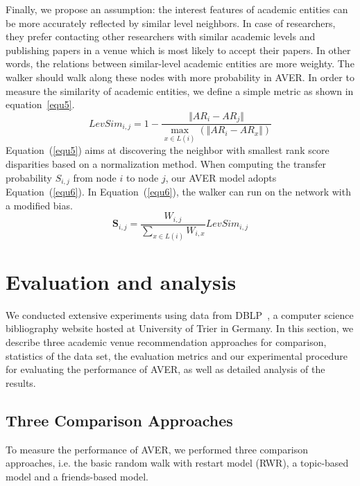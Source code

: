 \documentclass[9pt]{acm_proc_article-sp}
\begin{document}
Finally, we propose an assumption: the interest features of academic entities can be more accurately reflected by similar level neighbors. In case of researchers, they prefer contacting other researchers with similar academic levels and publishing papers in a venue which is most likely to accept their papers. In other words, the relations between similar-level academic entities are more weighty. The walker should walk along these nodes with more probability in AVER. In order to measure the similarity of academic entities, we define a simple metric as shown in equation~\ref{equ5}.
\begin{equation}
\label{equ5}
LevSim_{i,j}=1-\frac{\Vert AR_{i}-AR_{j}\Vert}{\max_{x\in L(i)}(\Vert AR_{i}-AR_{x}\Vert)}
\end{equation}
 Equation~(\ref{equ5}) aims at discovering the neighbor with smallest rank score disparities based on a normalization method. When computing the transfer probability $S_{i,j}$ from node $i$ to node $j$, our AVER model adopts Equation~(\ref{equ6}). In Equation~(\ref{equ6}), the walker can run on the network with a modified bias.
\begin{equation}
\label{equ6}
\mathbf{S}_{i,j}=\frac{W_{i,j}}{\sum_{x\in L(i)}W_{i,x}}LevSim_{i,j}
\end{equation}

\section{Evaluation and analysis}
\label{section:evaluation}
We conducted extensive experiments using data from DBLP~\cite{Ley:DBLP}, a computer science bibliography website hosted at University of Trier in Germany. In this section, we describe three academic venue recommendation approaches for comparison, statistics of the data set, the evaluation metrics and our experimental procedure for evaluating the performance of AVER, as well as detailed analysis of the results.

\subsection{Three Comparison Approaches}
To measure the performance of AVER, we performed three comparison approaches, i.e. the basic random walk with restart model (RWR), a topic-based model and a friends-based model.
\end{document}
